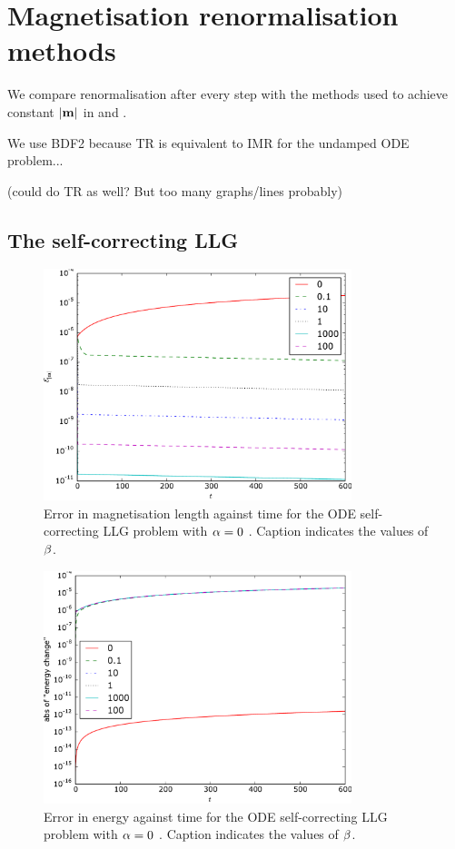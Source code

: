 

\section{Magnetisation renormalisation methods}
\label{sec:magn-renorm-meth}

We compare renormalisation after every step with the methods used to achieve constant $\left|{\boldsymbol{\mathrm{m}}} \right|$ in \nmag and \magpar.

We use BDF2 because TR is equivalent to IMR for the undamped ODE problem...

(could do TR as well? But too many graphs/lines probably)


\subsection{The self-correcting LLG}
\label{sec:self-correcting-llg-results}

\begin{figure}
  \centering
  \includegraphics[width=0.8\textwidth]{plots//self_correcting_ode/0-mlengtherrormaxesvstimes.pdf}
  \caption{
    Error in magnetisation length against time for the ODE self-correcting LLG problem with
    $\alpha = 0$
    . Caption indicates the values of $\beta$.
  }
\end{figure}

\begin{figure}
  \centering
  \includegraphics[width=0.8\textwidth]{plots//self_correcting_ode/0-absofenergychangevstimes.pdf}
  \caption{
    Error in energy against time for the ODE self-correcting LLG problem with
    $\alpha = 0$
    . Caption indicates the values of $\beta$.
  }
\end{figure}


